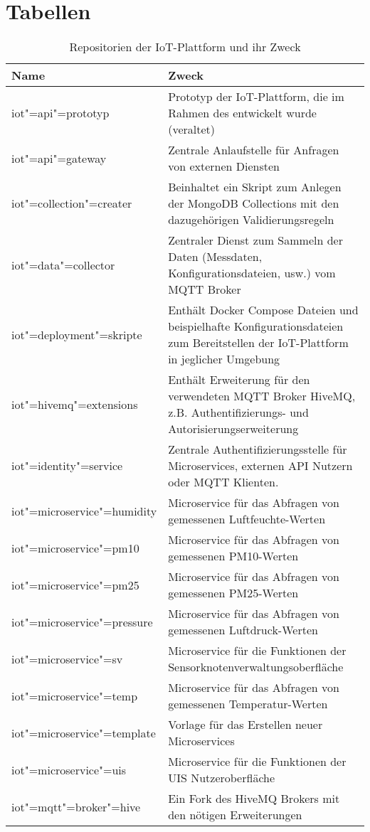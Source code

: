 
\section{Tabellen}

	\begin{table}[htb]
	\caption{Repositorien der IoT-Plattform und ihr Zweck}
	\begin{tabular}{|p{45mm}|p{93mm}|}
		\hline
		Name & Zweck \\ \hline
		iot"=api"=prototyp & Prototyp der IoT-Plattform, die im Rahmen des \schit entwickelt wurde (veraltet) \\ \hline
		iot"=api"=gateway & Zentrale Anlaufstelle für Anfragen von externen Diensten \\ \hline
		iot"=collection"=creater & Beinhaltet ein Skript zum Anlegen der MongoDB Collections mit den dazugehörigen Validierungsregeln \\ \hline
		iot"=data"=collector & Zentraler Dienst zum Sammeln der Daten (Messdaten, Konfigurationsdateien, usw.) vom MQTT Broker \\ \hline
		iot"=deployment"=skripte & Enthält Docker Compose Dateien und beispielhafte Konfigurationsdateien zum Bereitstellen der IoT-Plattform in jeglicher Umgebung \\ \hline
		iot"=hivemq"=extensions & Enthält Erweiterung für den verwendeten MQTT Broker HiveMQ, z.B. Authentifizierungs- und Autorisierungserweiterung \\ \hline
		iot"=identity"=service & Zentrale Authentifizierungsstelle für Microservices, externen API Nutzern oder MQTT Klienten. \\ \hline
		iot"=microservice"=humidity & Microservice für das Abfragen von gemessenen Luftfeuchte-Werten \\ \hline
		iot"=microservice"=pm10 & Microservice für das Abfragen von gemessenen PM10-Werten \\ \hline
		iot"=microservice"=pm25 & Microservice für das Abfragen von gemessenen PM25-Werten \\ \hline
		iot"=microservice"=pressure & Microservice für das Abfragen von gemessenen Luftdruck-Werten \\ \hline
		iot"=microservice"=sv & Microservice für die Funktionen der Sensorknotenverwaltungsoberfläche \\ \hline
		iot"=microservice"=temp & Microservice für das Abfragen von gemessenen Temperatur-Werten \\ \hline
		iot"=microservice"=template & Vorlage für das Erstellen neuer Microservices \\ \hline
		iot"=microservice"=uis & Microservice für die Funktionen der UIS Nutzeroberfläche \\ \hline
		iot"=mqtt"=broker"=hive & Ein Fork des HiveMQ Brokers mit den nötigen Erweiterungen \\ \hline
	\end{tabular}
	\label{tbl:iotrepos}
\end{table}

